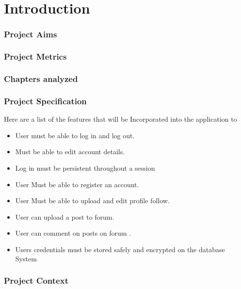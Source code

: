 \chapter{Introduction}


 \subsection{ Project Aims}
 
 
 
 
 
 \subsection{ Project Metrics}
  \subsection{ Chapters analyzed }
    \subsection{ Project  Specification }
    
    
Here are a list of the features that will be Incorporated into the application to 
    \begin{itemize}
  \item User must  be able to log in and log out.
  \item Must be able to edit account details.
  \item Log in must be persistent throughout a session
  \item User Must be able to register an account.
  \item User Must be able to upload and edit profile follow.
  \item User can upload a post to forum.
  \item User can comment on posts on forum .
  \item Users credentials must be stored safely and encrypted on the database System
\end{itemize}
    
    
    
    \subsection{ Project  Context }




